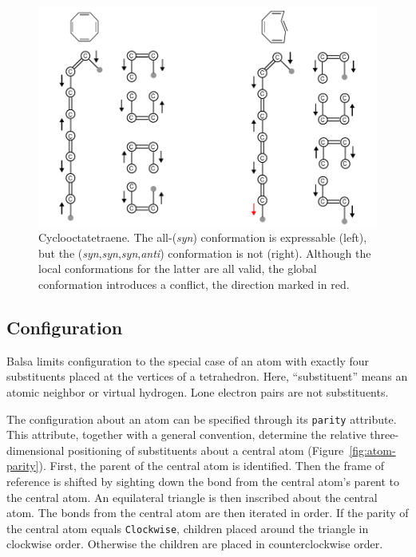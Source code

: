 \documentclass{article}
\def\ttt{\texttt}
\begin{document}
\begin{figure}
    \centering
    \includegraphics[width=\columnwidth]{cyclooctatetraene.pdf}
    \caption{Cyclooctatetraene. The all-(\textit{syn}) conformation is expressable (left), but the (\textit{syn},\textit{syn},\textit{syn},\textit{anti}) conformation is not (right). Although the local conformations for the latter are all valid, the global conformation introduces a conflict, the direction marked in red.}
    \label{fig:cyclooctatetraene}
\end{figure}

\subsection*{Configuration}
\label{configuration}

Balsa limits configuration to the special case of an atom with exactly four substituents placed at the vertices of a tetrahedron. Here, \enquote{substituent} means an atomic neighbor or virtual hydrogen. Lone electron pairs are not substituents.

The configuration about an atom can be specified through its \ttt{parity} attribute. This attribute, together with a general convention, determine the relative three-dimensional positioning of substituents about a central atom (Figure~\ref{fig:atom-parity}). First, the parent of the central atom is identified. Then the frame of reference is shifted by sighting down the bond from the central atom's parent to the central atom. An equilateral triangle is then inscribed about the central atom. The bonds from the central atom are then iterated in order. If the parity of the central atom equals \ttt{Clockwise}, children placed around the triangle in clockwise order. Otherwise the children are placed in counterclockwise order.
\end{document}

